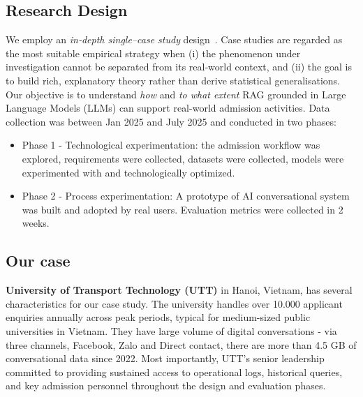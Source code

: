 \documentclass[runningheads]{llncs}
\begin{document}
\subsection{Research Design}
\label{sec:design}
We employ an \emph{in‐depth single–case study} design~\cite{runeson_guidelines_2008}. Case studies are regarded as the most suitable empirical strategy when (i) the phenomenon under investigation cannot be separated from its real‐world context, and (ii) the goal is to build rich, explanatory theory rather than derive statistical generalisations. Our objective is to understand \emph{how} and \emph{to what extent} RAG grounded in Large Language Models (LLMs) can support real-world admission activities. Data collection was between Jan 2025 and July 2025 and conducted in two phases:
\begin{itemize}
    \item Phase 1 - Technological experimentation: the admission workflow was explored, requirements were collected, datasets were collected, models were experimented with and technologically optimized.
    \item Phase 2 - Process experimentation: A prototype of AI conversational system was built and adopted by real users. Evaluation metrics were collected in 2 weeks.
\end{itemize}

\subsection{Our case}
\textbf{University of Transport Technology (UTT)} in Hanoi, Vietnam, has several characteristics for our case study. The university handles over \num{10,000} applicant enquiries annually across peak periods, typical for medium-sized public universities in Vietnam. They have large volume of digital conversations - via three channels, Facebook, Zalo and Direct contact, there are more than 4.5 GB of conversational data since 2022. Most importantly, UTT’s senior leadership committed to providing sustained access to operational logs, historical queries, and key admission personnel throughout the design and evaluation phases.
\end{document}
